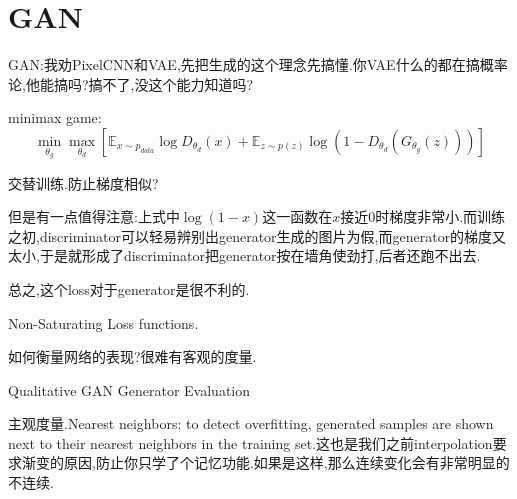 \section{GAN}
	
	GAN:我劝PixelCNN和VAE,先把生成的这个理念先搞懂.你VAE什么的都在搞概率论,他能搞吗?搞不了,没这个能力知道吗?
	
	minimax game:
	\begin{equation}
		\min _{\theta_{g}} \max _{\theta_{d}}\left[\mathbb{E}_{x \sim p_{d a t a}} \log D_{\theta_{d}}(x)+\mathbb{E}_{z \sim p(z)} \log \left(1-D_{\theta_{d}}\left(G_{\theta_{g}}(z)\right)\right)\right]
	\end{equation}

	交替训练.防止梯度相似?
	
	但是有一点值得注意:上式中$\log(1-x)$这一函数在$x$接近$0$时梯度非常小.而训练之初,discriminator可以轻易辨别出generator生成的图片为假,而generator的梯度又太小,于是就形成了discriminator把generator按在墙角使劲打,后者还跑不出去.
	
	
	
	总之,这个loss对于generator是很不利的.
	
	Non-Saturating Loss functions.
	
	如何衡量网络的表现?很难有客观的度量.
	
	Qualitative GAN Generator Evaluation
	
	主观度量.Nearest neighbors: to detect overfitting, generated samples are shown next to their nearest neighbors in the training set.这也是我们之前interpolation要求渐变的原因,防止你只学了个记忆功能.如果是这样,那么连续变化会有非常明显的不连续.
	
